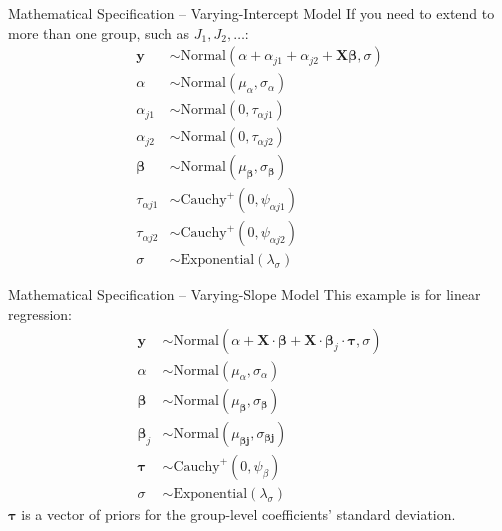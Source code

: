 \begin{frame}{Mathematical Specification -- Varying-Intercept Model}
	If you need to extend to more than one group,
	such as $J_1, J_2, \dots$:
	$$
		\begin{aligned}
			\mathbf{y}         & \sim \text{Normal}(\alpha + \alpha_{j1} + \alpha_{j2} + \mathbf{X} \boldsymbol{\beta}, \sigma) \\
			\alpha             & \sim \text{Normal}(\mu_\alpha, \sigma_\alpha)                                                  \\
			\alpha_{j1}        & \sim \text{Normal}(0, \tau_{\alpha j1})                                                        \\
			\alpha_{j2}        & \sim \text{Normal}(0, \tau_{\alpha j2})                                                        \\
			\boldsymbol{\beta} & \sim \text{Normal}(\mu_{\boldsymbol{\beta}}, \sigma_{\boldsymbol{\beta}})                      \\
			\tau_{\alpha j1}   & \sim \text{Cauchy}^+(0, \psi_{\alpha j1})                                                      \\
			\tau_{\alpha j2}   & \sim \text{Cauchy}^+(0, \psi_{\alpha j2})                                                      \\
			\sigma             & \sim \text{Exponential}(\lambda_\sigma)
		\end{aligned}
	$$
\end{frame}

\begin{frame}{Mathematical Specification -- Varying-Slope Model}
	This example is for linear regression:
	$$
		\begin{aligned}
			\mathbf{y}           & \sim \text{Normal}\left( \alpha + \mathbf{X} \cdot \boldsymbol{\beta} + \mathbf{X} \cdot \boldsymbol{\beta}_j \cdot \boldsymbol{\tau}, \sigma \right) \\
			\alpha               & \sim \text{Normal}(\mu_\alpha, \sigma_\alpha)                                                                                                         \\
			\boldsymbol{\beta}   & \sim \text{Normal}(\mu_{\boldsymbol{\beta}}, \sigma_{\boldsymbol{\beta}})                                                                             \\
			\boldsymbol{\beta}_j & \sim \text{Normal}(\mu_{\boldsymbol{\beta j}}, \sigma_{\boldsymbol{\beta j}})                                                                         \\
			\boldsymbol{\tau}    & \sim \text{Cauchy}^+(0, \psi_{\beta})                                                                                                                 \\
			\sigma               & \sim \text{Exponential}(\lambda_\sigma)
		\end{aligned}
	$$
	$\boldsymbol{\tau}$ is a vector of priors for the group-level coefficients'
	standard deviation.
\end{frame}

